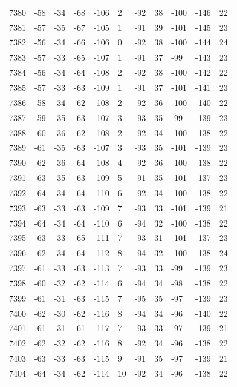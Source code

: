 \begin{table}[H]
\begin{tabular}{lllllllllll}
7380 & -58 & -34 & -68 & -106 & 2 & -92 & 38 & -100 & -146 & 22 \\
7381 & -57 & -35 & -67 & -105 & 1 & -91 & 39 & -101 & -145 & 23 \\
7382 & -56 & -34 & -66 & -106 & 0 & -92 & 38 & -100 & -144 & 24 \\
7383 & -57 & -33 & -65 & -107 & 1 & -91 & 37 & -99 & -143 & 23 \\
7384 & -56 & -34 & -64 & -108 & 2 & -92 & 38 & -100 & -142 & 22 \\
7385 & -57 & -33 & -63 & -109 & 1 & -91 & 37 & -101 & -141 & 23 \\
7386 & -58 & -34 & -62 & -108 & 2 & -92 & 36 & -100 & -140 & 22 \\
7387 & -59 & -35 & -63 & -107 & 3 & -93 & 35 & -99 & -139 & 23 \\
7388 & -60 & -36 & -62 & -108 & 2 & -92 & 34 & -100 & -138 & 22 \\
7389 & -61 & -35 & -63 & -107 & 3 & -93 & 35 & -101 & -139 & 23 \\
7390 & -62 & -36 & -64 & -108 & 4 & -92 & 36 & -100 & -138 & 22 \\
7391 & -63 & -35 & -63 & -109 & 5 & -91 & 35 & -101 & -137 & 23 \\
7392 & -64 & -34 & -64 & -110 & 6 & -92 & 34 & -100 & -138 & 22 \\
7393 & -63 & -33 & -63 & -109 & 7 & -93 & 33 & -101 & -139 & 21 \\
7394 & -64 & -34 & -64 & -110 & 6 & -94 & 32 & -100 & -138 & 22 \\
7395 & -63 & -33 & -65 & -111 & 7 & -93 & 31 & -101 & -137 & 23 \\
7396 & -62 & -34 & -64 & -112 & 8 & -94 & 32 & -100 & -138 & 24 \\
7397 & -61 & -33 & -63 & -113 & 7 & -93 & 33 & -99 & -139 & 23 \\
7398 & -60 & -32 & -62 & -114 & 6 & -94 & 34 & -98 & -138 & 22 \\
7399 & -61 & -31 & -63 & -115 & 7 & -95 & 35 & -97 & -139 & 23 \\
7400 & -62 & -30 & -62 & -116 & 8 & -94 & 34 & -96 & -140 & 22 \\
7401 & -61 & -31 & -61 & -117 & 7 & -93 & 33 & -97 & -139 & 21 \\
7402 & -62 & -32 & -62 & -116 & 8 & -92 & 34 & -96 & -138 & 22 \\
7403 & -63 & -33 & -63 & -115 & 9 & -91 & 35 & -97 & -139 & 21 \\
7404 & -64 & -34 & -62 & -114 & 10 & -92 & 34 & -96 & -138 & 22 \\

\end{tabular}
\end{table}
